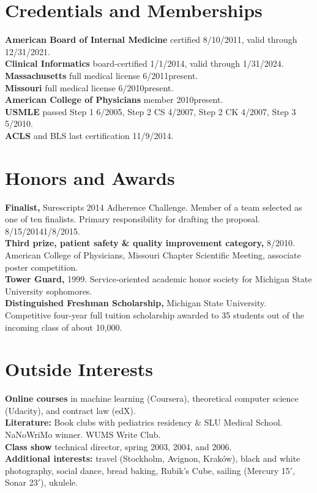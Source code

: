 \documentclass[10pt]{article}
\begin{document}
\section*{Credentials and Memberships}
\textbf{American Board of Internal Medicine} certified 8/10/2011,
valid through 12/31/2021.\\
\textbf{Clinical Informatics} board-certified 1/1/2014, valid through
1/31/2024.\\
\textbf{Massachusetts} full medical license 6/2011\ndash{}present.\\
\textbf{Missouri} full medical license 6/2010\ndash{}present.\\
\textbf{American College of Physicians} member 2010\ndash{}present.\\
\textbf{USMLE} passed Step 1 6/2005, Step 2 CS 4/2007, Step 2 CK
4/2007, Step 3 5/2010.\\
\textbf{ACLS} and BLS last certification 11/9/2014.

\section*{Honors and Awards}

\textbf{Finalist,} Surescripts 2014 Adherence Challenge. Member of a
team selected as one of ten finalists. Primary responsibility for
drafting the proposal. 8/15/2014\ndash{}1/8/2015.\\
\textbf{Third prize, patient safety \& quality improvement category,}
8/2010. American College of Physicians, Missouri Chapter Scientific
Meeting, associate poster competition.\\
\textbf{Tower Guard,} 1999. Service-oriented academic honor
society for Michigan State University sophomores.\\
\textbf{Distinguished Freshman Scholarship,} Michigan State
University. Competitive four-year full tuition scholarship awarded to
35 students out of the incoming class of about 10,000.

\section*{Outside Interests}

\textbf{Online courses} in machine learning (Coursera), theoretical
computer science (Udacity), and contract law (edX).\\
\textbf{Literature:} Book clubs with pediatrics residency \& SLU
Medical School.
NaNoWriMo winner. WUMS Write Club.\\
\textbf{Class show} technical director, spring 2003, 2004, and 2006.\\
\textbf{Additional interests:} travel (Stockholm, Avignon, Krak\'ow),
black and white photography, social dance, bread baking, Rubik’s Cube,
sailing (Mercury 15$'$, Sonar 23$'$), ukulele.
\end{document}
